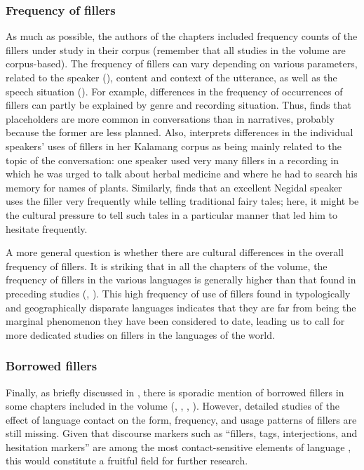 \documentclass[output=paper]{langscibook}
\begin{document}
\subsubsection{Frequency of fillers}\label{sec:intro:9.3.4}
As much as possible, the authors of the chapters included frequency counts of the fillers under study in their corpus (remember that all studies in the volume are corpus-based). The frequency of fillers can vary depending on various parameters, related to the speaker (), content and context of the utterance, as well as the speech situation (\citealt{Corley2008}). For example, differences in the frequency of occurrences of fillers can partly be explained by genre and recording situation. Thus, \citeauthor{chapters/visser} finds that placeholders are more common in conversations than in narratives, probably because the former are less planned. Also, \citeauthor{chapters/visser} interprets differences in the individual speakers’ uses of fillers in her Kalamang corpus as being mainly related to the topic of the conversation: one speaker used very many fillers in a recording in which he was urged to talk about herbal medicine and where he had to search his memory for names of plants. Similarly, \citeauthor{chapters/pakendorf} finds that an excellent Negidal speaker uses the filler very frequently while telling traditional fairy tales; here, it might be the cultural pressure to tell such tales in a particular manner that led him to hesitate frequently.

A more general question is whether there are cultural differences in the overall frequency of fillers. It is striking that in all the chapters of the volume, the frequency of fillers in the various languages is generally higher than that found in preceding studies (\citealt{Zhao2005}, \citealt{Podlesskaya2009}). This high frequency of use of fillers found in typologically and geographically disparate languages indicates that they are far from being the marginal phenomenon they have been considered to date, leading us to call for more dedicated studies on fillers in the languages of the world.


\subsubsection{Borrowed fillers}\label{sec:intro:9.3.5}
Finally, as briefly discussed in , there is sporadic mention of borrowed fillers in some chapters included in the volume (\citeauthor{chapters/klyachko}, \citeauthor{chapters/ventayol_boada}, \citeauthor{chapters/visser}, \citeauthor{chapters/rice}). However, detailed studies of the effect of language contact on the form, frequency, and usage patterns of fillers are still missing. Given that discourse markers such as “fillers, tags, interjections, and hesitation markers” are among the most contact-sensitive elements of language \citep[193]{Matras2009}, this would constitute a fruitful field for further research. 
\end{document}
